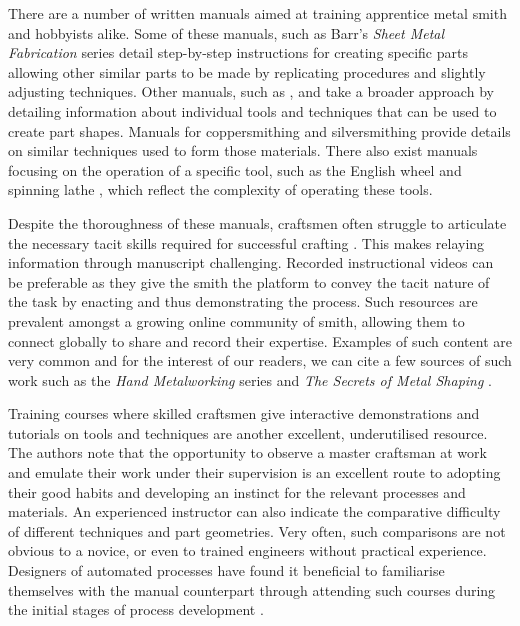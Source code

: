 There are a number of written manuals aimed at training apprentice metal smith and hobbyists alike. Some of these manuals, such as Barr's \emph{Sheet Metal Fabrication} series \citep{Barr2013ProfessionalFabrication,Barr2019SheetProjects} detail step-by-step instructions for creating specific parts allowing other similar parts to be made by replicating procedures and slightly adjusting techniques. Other manuals, such as \cite{Timings2008SheetMetalwork}, \cite{Thompson2007ManufacturingProfessionals} and \cite{Wakeford1985SheetWork} take a broader approach by detailing information about individual tools and techniques that can be used to create part shapes. Manuals for coppersmithing \citep{Fuller1904ArtForms} and silversmithing \citep{Hill2014ManufacturingProcesses} provide details on similar techniques used to form those materials. There also exist manuals focusing on the operation of a specific tool, such as the English wheel \citep{Longyard2014LearningWheel} and spinning lathe \citep{Tuells1912MetalUsed}, which reflect the complexity of operating these tools.

Despite the thoroughness of these manuals, craftsmen often struggle to articulate the necessary tacit skills required for successful crafting \citep{Wood2009ACraftsmen}. This makes relaying information through manuscript challenging. Recorded instructional videos can be preferable as they give the smith the platform to convey the tacit nature of the task by enacting and thus demonstrating the process. Such resources are prevalent amongst a growing online community of smith, allowing them to connect globally to share and record their expertise. Examples of such content are very common and for the interest of our readers, we can cite a few sources of such work such as the \emph{Hand Metalworking} series \citep{CorvellRonSeries} and \emph{The Secrets of Metal Shaping} \citep{LazzeTheShaping}.

Training courses where skilled craftsmen give interactive demonstrations and tutorials on tools and techniques are another excellent, underutilised resource. The authors note that the opportunity to observe a master craftsman at work and emulate their work under their supervision is an excellent route to adopting their good habits and developing an instinct for the relevant processes and materials. An experienced instructor can also indicate the comparative difficulty of different techniques and part geometries. Very often, such comparisons are not obvious to a novice, or even to trained engineers without practical experience. Designers of automated processes have found it beneficial to familiarise themselves with the manual counterpart through attending such courses during the initial stages of process development \citep{Ilangovan2016FixturelessForming}.

